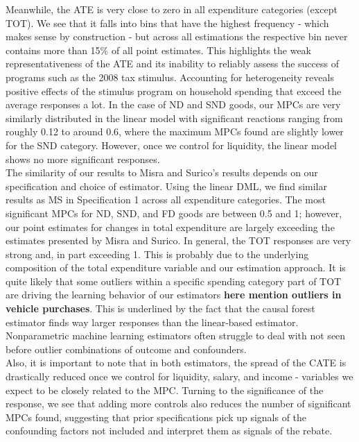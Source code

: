 Meanwhile, the ATE is very close to zero in all expenditure categories (except TOT). We see that it falls into bins that have the highest frequency - which makes sense by construction - but across all estimations the respective bin never contains more than 15\% of all point estimates. This highlights the weak representativeness of the ATE and its inability to reliably assess the success of programs such as the 2008 tax stimulus. Accounting for heterogeneity reveals positive effects of the stimulus program on household spending that exceed the average responses a lot. In the case of ND and SND goods, our MPCs are very similarly distributed in the linear model with significant reactions ranging from roughly 0.12 to around 0.6, where the maximum MPCs found are slightly lower for the SND category. However, once we control for liquidity, the linear model shows no more significant responses. \\
The similarity of our results to Misra and Surico's results depends on our specification and choice of estimator. Using the linear DML, we find similar results as MS in Specification 1 across all expenditure categories. The most significant MPCs for ND, SND, and FD goods are between 0.5 and 1; however, our point estimates for changes in total expenditure are largely exceeding the estimates presented by Misra and Surico. In general, the TOT responses are very strong and, in part exceeding 1. This is probably due to the underlying composition of the total expenditure variable and our estimation approach. It is quite likely that some outliers within a specific spending category part of TOT are driving the learning behavior of our estimators \textbf{here mention outliers in vehicle purchases}. This is underlined by the fact that the causal forest estimator finds way larger responses than the linear-based estimator. Nonparametric machine learning estimators often struggle to deal with not seen before outlier combinations of outcome and confounders. \\
Also, it is important to note that in both estimators, the spread of the CATE is drastically reduced once we control for liquidity, salary, and income - variables we expect to be closely related to the MPC. Turning to the significance of the response, we see that adding more controls also reduces the number of significant MPCs found, suggesting that prior specifications pick up signals of the confounding factors not included and interpret them as signals of the rebate. \\
